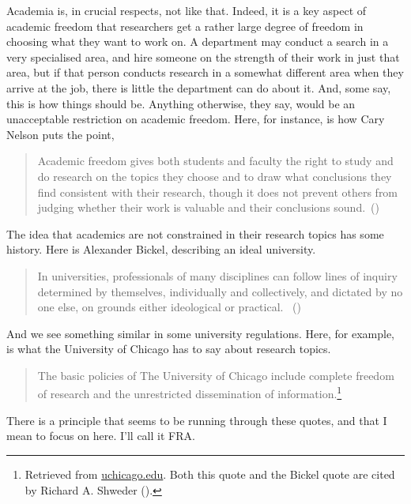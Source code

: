 \documentclass[
  11pt,
  letterpaper,
  DIV=11,
  numbers=noendperiod,
  twoside]{scrartcl}
\begin{document}
Academia is, in crucial respects, not like that. Indeed, it is a key
aspect of academic freedom that researchers get a rather large degree of
freedom in choosing what they want to work on. A department may conduct
a search in a very specialised area, and hire someone on the strength of
their work in just that area, but if that person conducts research in a
somewhat different area when they arrive at the job, there is little the
department can do about it. And, some say, this is how things should be.
Anything otherwise, they say, would be an unacceptable restriction on
academic freedom. Here, for instance, is how Cary Nelson puts the point,

\begin{quote}
Academic freedom gives both students and faculty the right to study and
do research on the topics they choose and to draw what conclusions they
find consistent with their research, though it does not prevent others
from judging whether their work is valuable and their conclusions
sound.~()
\end{quote}

The idea that academics are not constrained in their research topics has
some history. Here is Alexander Bickel, describing an ideal university.

\begin{quote}
In universities, professionals of many disciplines can follow lines of
inquiry determined by themselves, individually and collectively, and
dictated by no one else, on grounds either ideological or practical.
~()
\end{quote}

And we see something similar in some university regulations. Here, for
example, is what the University of Chicago has to say about research
topics.

\begin{quote}
The basic policies of The University of Chicago include complete freedom
of research and the unrestricted dissemination of
information.\footnote{Retrieved from
  \href{https://provost.uchicago.edu/handbook/research/research-policies}{uchicago.edu}.
  Both this quote and the Bickel quote are cited by Richard A. Shweder
  ().}
\end{quote}

There is a principle that seems to be running through these quotes, and
that I mean to focus on here. I'll call it FRA.
\end{document}
